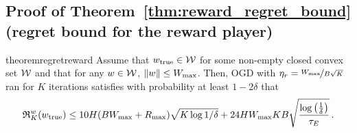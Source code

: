 \subsection{Proof of Theorem~\ref{thm:reward_regret_bound} (regret bound for the reward player)}

\begin{restatable}{theorem}{regretreward} \label{thm:reward_regret_bound}
    Assume that $w_{\mathrm{true}} \in \mathcal{W}$ for some non-empty closed convex set $\mathcal{W}$ and that for any $w \in \mathcal{W}$, $\left\|w\right\|\leq W_{\max}$. Then, OGD with $\eta_r = \nicefrac{W_{\max}}{B \sqrt{K}}$ ran for $K$ iterations satisfies with probability at least $1 - 2 \delta$ that
    \begin{equation*}
        \mathfrak{R}_K^w(w_{\mathrm{true}}) \leq 10 H (B W_{\max} + R_{\max}) \sqrt{K \log 1 / \delta} + 24 H W_{\max} K B \sqrt{\frac{\log\left({\frac{1}{\delta}}\right)}{\tau_E}}\,.
    \end{equation*}
\end{restatable}

